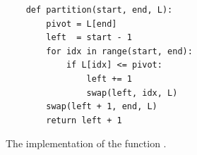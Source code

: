 \begin{figure}[!ht]
  \centering
\begin{verbatim}
    def partition(start, end, L):
        pivot = L[end]
        left  = start - 1
        for idx in range(start, end):
            if L[idx] <= pivot:
                left += 1
                swap(left, idx, L)
        swap(left + 1, end, L)
        return left + 1
\end{verbatim}
\vspace*{-0.7cm}
  \caption{The implementation of the function .}
  \label{fig:quick-sort-array.stlx-partition}
\end{figure}
\FloatBarrier

